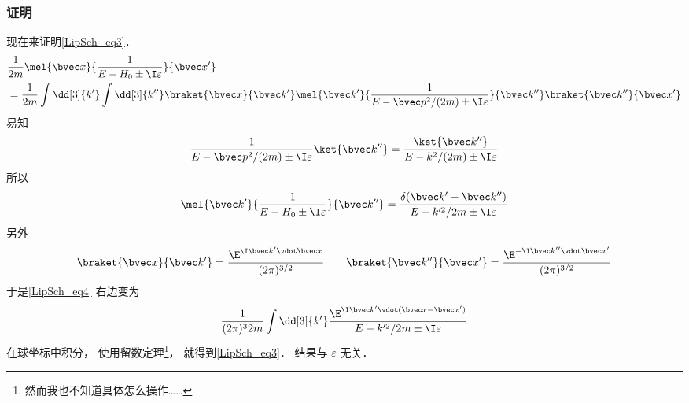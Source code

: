 \subsubsection{证明}
现在来证明\autoref{LipSch_eq3}．
\begin{equation}\label{LipSch_eq4}
\begin{aligned}
&\frac{1}{2m} \mel{\bvec x}{\frac{1}{E-H_0\pm \I\varepsilon}}{\bvec x'}\\
&= \frac{1}{2m} \int \dd[3]{k'} \int \dd[3]{k''} \braket{\bvec x}{\bvec k'}\mel{\bvec k'}{\frac{1}{E-\bvec p^2/(2m)\pm \I\varepsilon}}{\bvec k''} \braket{\bvec k''}{\bvec x'}
\end{aligned}
\end{equation}
易知
\begin{equation}
\frac{1}{E-\bvec p^2/(2m)\pm \I\varepsilon}\ket{\bvec k''} = \frac{\ket{\bvec k''}}{E- k^2/(2m)\pm \I\varepsilon}
\end{equation}
所以
\begin{equation}
\mel{\bvec k'}{\frac{1}{E-H_0\pm \I\varepsilon}}{\bvec k''} = \frac{\delta(\bvec k'-\bvec k'')}{E-k'^2/2m\pm\I\varepsilon}
\end{equation}
另外
\begin{equation}
\braket{\bvec x}{\bvec k'} = \frac{\E^{\I \bvec k'\vdot \bvec x}}{(2\pi)^{3/2}}
\qquad
\braket{\bvec k''}{\bvec x'} = \frac{\E^{-\I \bvec k''\vdot \bvec x'}}{(2\pi)^{3/2}}
\end{equation}
于是\autoref{LipSch_eq4} 右边变为
\begin{equation}
\frac{1}{(2\pi)^32m}\int\dd[3]{k'}  \frac{\E^{\I \bvec k'\vdot (\bvec x-\bvec x')}}{E-k'^2/2m\pm\I\varepsilon}
\end{equation}
在球坐标中积分， 使用留数定理\footnote{然而我也不知道具体怎么操作……}， 就得到\autoref{LipSch_eq3}． 结果与 $\varepsilon$ 无关．
